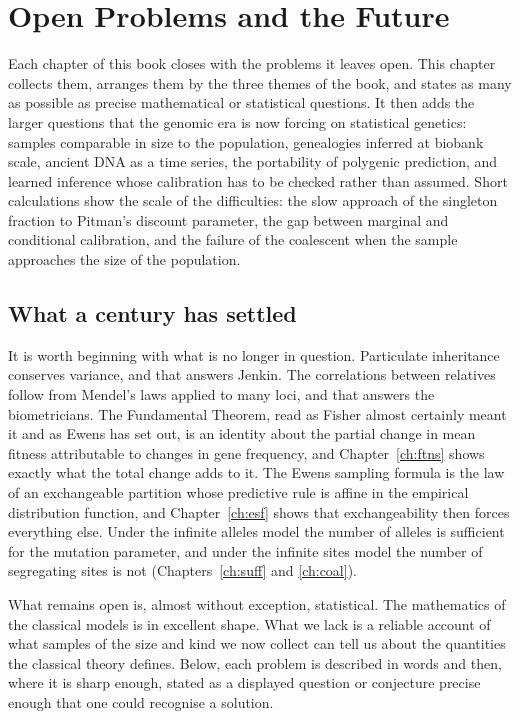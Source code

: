 \chapter{Open Problems and the Future}\label{ch:future}

\begin{chaptersummary}
Each chapter of this book closes with the problems it leaves open. This chapter collects them,
arranges them by the three themes of the book, and states as many as possible as precise
mathematical or statistical questions. It then adds the larger questions that the genomic era is
now forcing on statistical genetics: samples comparable in size to the population, genealogies
inferred at biobank scale, ancient DNA as a time series, the portability of polygenic prediction,
and learned inference whose calibration has to be checked rather than assumed. Short calculations show
the scale of the difficulties: the slow approach of the singleton fraction to Pitman's discount
parameter, the gap between marginal and conditional calibration, and the failure of the
coalescent when the sample approaches the size of the population.
\end{chaptersummary}

\section{What a century has settled}

It is worth beginning with what is no longer in question. Particulate inheritance conserves
variance, and that answers Jenkin. The correlations between relatives follow from Mendel's laws
applied to many loci, and that answers the biometricians. The Fundamental Theorem, read as Fisher
almost certainly meant it and as Ewens has set out, is an identity about the partial change in mean
fitness attributable to changes in gene frequency, and Chapter~\ref{ch:ftns} shows exactly what the
total change adds to it. The Ewens sampling formula is the law of an exchangeable partition whose
predictive rule is affine in the empirical distribution function, and Chapter~\ref{ch:esf} shows
that exchangeability then forces everything else. Under the infinite alleles model the number of
alleles is sufficient for the mutation parameter, and under the infinite sites model the number of
segregating sites is not (Chapters~\ref{ch:suff} and \ref{ch:coal}).

What remains open is, almost without exception, statistical. The mathematics of the classical
models is in excellent shape. What we lack is a reliable account of what samples of the size and
kind we now collect can tell us about the quantities the classical theory defines. Below, each problem is described in words and then, where it is sharp enough, stated
as a displayed question or conjecture precise enough that one could recognise a solution.

